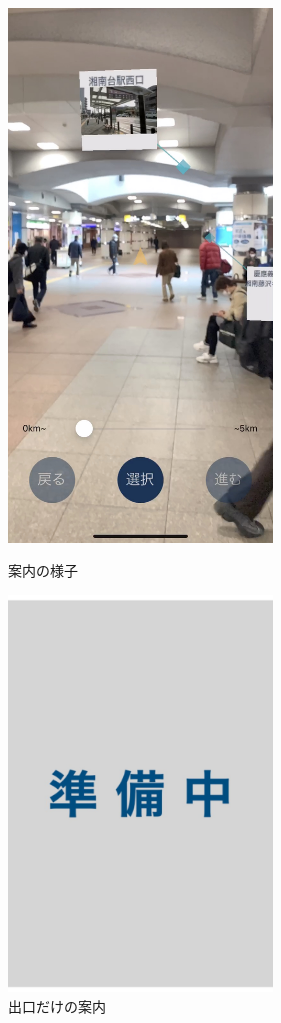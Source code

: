 \begin{figure}[h]
  \begin{minipage}{0.5\hsize}
    \centering
    \includegraphics[width=70mm]{images/ar_navigation_shonandai.jpg}
    \caption{案内の様子} \label{fig:ar_navigation_shonandai}
  \end{minipage}
  \begin{minipage}{0.5\hsize}
    \centering
    \includegraphics[width=70mm]{images/wip2.jpg}
    \caption{出口だけの案内} \label{fig:ar_navigation_exit}
  \end{minipage}
\end{figure}

